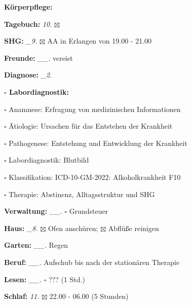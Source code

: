 \documentclass[10pt,a4paper]{article}
\newcommand\prop[1] {{\color {alizarin} {\bf #1}}}        %
\newcommand\mand[1] {{\color {burntorange} {\bf #1}}}     %
\newcommand\topspace{\vskip -15pt \hskip 20pt}
\newcommand\bottomspace{\vskip 4pt}
\newcommand\n[1] { {\sl #1.} \hskip 5pt }
\begin{document}
\begin{mdframed}[style=daystyle]
\begin{labeling}{{\mand {Körperpflege:}}}
    \bottomspace    
  \item[{\mand {Tagebuch:}}]       \n{10} $\boxtimes$
  \item[{\mand {SHG:}}]           \n{\_9} $\boxtimes$ AA in Erlangen von 19.00 - 21.00
  \item[{\mand {Freunde:}}]      \n{\_\_} vereist
  \item[{\mand {Diagnose:}}]      \n{\_2}
    \topspace
    \begin{minipage}{0.75\textwidth}  
      \begin{labeling}{{\prop {$\square$ Labordiagnostik:}}} 
        \setlength\itemsep{-3pt}
      \item[$\square$ Anamnese:]        Erfragung von medizinischen Informationen
      \item[$\square$ Ätiologie:]       Ursachen für das Entstehen der Krankheit
      \item[$\square$ Pathogenese:]     Entstehung und Entwicklung der Krankheit
      \item[$\square$ Labordiagnostik:] Blutbild
      \item[$\square$ Klassifikation:]  ICD-10-GM-2022: Alkoholkrankheit F10
      \item[$\square$ Therapie:]        Abstinenz, Alltagsstruktur und SHG
      \end{labeling}
    \end{minipage}
    \bottomspace
  \item[{\mand {Verwaltung:}}]   \n{\_\_} $\square$ Grundsteuer
  \item[{\mand {Haus:}}]          \n{\_8} $\boxtimes$ Ofen anschüren; $\boxtimes$ Abflüße reinigen
  \item[{\mand {Garten:}}]       \n{\_\_} Regen
  \item[{\mand {Beruf:}}]        \n{\_\_} Aufschub bis nach der stationären Therapie
  \item[{\mand {Lesen:}}]        \n{\_\_} $\square$ ??? (1 Std.)
  \item[{\mand {Schlaf:}}]         \n{11} $\boxtimes$ 22.00 - 06.00 (5 Stunden)
  \end{labeling}


\end{mdframed}
\end{document}
